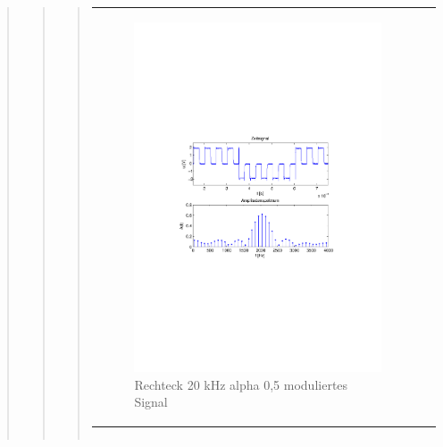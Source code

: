 \begin{quote}
\begin{quote}
\begin{quote}
\begin{center}
\begin{tabular}{ll}
                \begin{minipage}{0.6\textwidth}
                    \begin{figure}[H]
                        \includegraphics[scale=0.7, trim = 35mm 100mm 35mm 95mm, clip]{Bilder/flatrec20_05abget_zeit}
                       \caption{Rechteck 20 kHz alpha 0,5 moduliertes Signal}
		              \label{fig:flatrec20_05zeit}
                    \end{figure}
                \end{minipage}
            
            \end{tabular}
            \end{center}
            
            \begin{center}
            \begin{tabular}{ll}
            

\end{tabular}
\end{center}
\end{quote}
\end{quote}
\end{quote}
